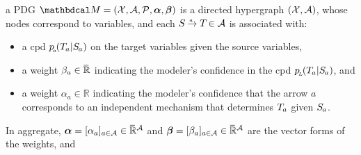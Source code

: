 \documentclass[twoside]{article}
\begin{document}
\begin{defn}
    a PDG $\dg M = (\X, \Ar, \mathcal P, \balpha, \bbeta )
    $
    is a directed hypergraph  $(\mathcal X, \mathcal A)$, whose nodes correspond to variables, and
    each
    $\ed a{\Src {}}{\Tgt {}} \in \Ar$
    is associated with:
    \begin{itemize}[itemsep=0pt]
        \item a cpd $p\ssub a (\Tgt a | \Src a)$ on the target variables given the source variables,
        \item a weight $\beta_a \in \mskip1mu\overline{\mskip-1mu\mathbb R\!}\,$ indicating
            the modeler's confidence in the cpd $p\ssub L(\Tgt a | \Src a)$, and
        \item a weight $\alpha_a \in \mathbb R$ indicating
            the modeler's confidence that the arrow $a$ corresponds to an independent mechanism that determines $\Tgt a$ given $\Src a$.
    \end{itemize}
    In aggregate, $\boldsymbol\alpha = [\alpha_a]_{a \in \mathcal A} \in \mskip1mu\overline{\mskip-1mu\mathbb R\!}\,^\mathcal A$ and $\boldsymbol\beta = [\beta_a]_{a \in \mathcal A} \in \mskip1mu\overline{\mskip-1mu\mathbb R\!}\,^\mathcal A$ are the vector forms of the weights, and
\end{defn}
\end{document}
